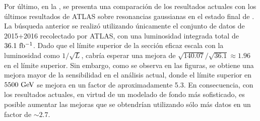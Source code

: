 Por último, en la \Fig{\ref{fig:results:results:bkgsig:results:gaus:limits_comparison_old}}, se presenta una comparación de los resultados actuales con los últimos resultados de \ac{ATLAS} sobre resonancias gaussianas en el estado final de \gammajet. La búsqueda anterior se realizó utilizando únicamente el conjunto de datos de 2015+2016 recolectado por \ac{ATLAS}, con una luminosidad integrada total de \(36.1~\ifb\). Dado que el límite superior de la sección eficaz escala con la luminosidad como \(1 / \sqrt{L}\), cabría esperar una mejora de \(\sqrt{140.07} / \sqrt{36.1} \approx 1.96\) en el límite superior. Sin embargo, como se observa en las figuras, se obtiene una mejora mayor de la sensibilidad en el análisis actual, donde el límite superior en \(5500~\gev\) se mejora en un factor de aproximadamente 5.3. En consecuencia, con los resultados actuales, en virtud de un modelado de fondo más sofisticado, es posible aumentar las mejoras que se obtendrían utilizando sólo más datos en un factor de \(\sim 2.7\).